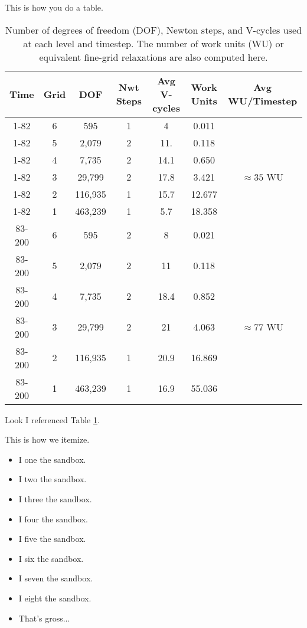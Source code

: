 \documentclass[final]{siamltex}
\begin{document}
This is how you do a table.  
\begin{table}[h!]
\centering
{\small
\begin{tabular}{|c|c|c|c|c|c|c|}

\hline

Time&Grid&DOF&Nwt Steps&Avg V-cycles&Work Units&Avg WU/Timestep\\

\hline

1-82&6&595&1&4&0.011&\\

1-82&5&2,079&2&11.&0.118&\\

1-82&4&7,735&2&14.1&0.650&\\

1-82&3&29,799&2&17.8&3.421&$\approx 35$ WU\\

1-82&2&116,935&1&15.7&12.677&\\

1-82&1&463,239&1&5.7&18.358&\\
\hline

83-200&6&595&2&8&0.021&\\

83-200&5&2,079&2&11&0.118&\\

83-200&4&7,735&2&18.4&0.852&\\

83-200&3&29,799&2&21&4.063& $\approx 77$ WU\\

83-200&2&116,935&1&20.9&16.869&\\

83-200&1&463,239&1&16.9&55.036&\\

\hline

\end{tabular}
}

\caption{Number of degrees of freedom (DOF), Newton steps, and V-cycles used at each level and timestep.  The number of work units (WU) or equivalent fine-grid relaxations are also computed here.}
\label{tearingunif}
\end{table}



Look I referenced Table \ref{tearingunif}. 

This is how we itemize.
\begin{itemize}
\item[1.]	I one the sandbox.
\item[2.] I two the sandbox. 
\item[3.]	I three the sandbox.
\item[4.] I four the sandbox. 
\item[5.]	I five the sandbox.
\item[6.] I six the sandbox. 
\item[7.]	I seven the sandbox.
\item[8.] I eight the sandbox. 
\item[9.] That's gross...
\end{itemize}
	
\end{document}
